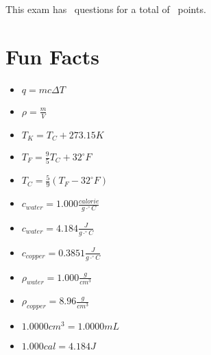 \documentclass[11pt,addpoints]{exam}   	%
\begin{document}
\begin{center}
This exam has \numquestions\ questions for a total of \numpoints\ points.
\end{center}

\pagebreak
\section*{Fun Facts}
\begin{itemize}
\item
$q = m c \Delta T$
\vspace{0.2in}

\item
$\rho = \frac{m}{V} $
\vspace{0.2in}

\item
$T_K = T_C + 273.15 K$
\vspace{0.2in}

\item
$T_F = \frac{9}{5}T_C + 32^{\circ}F$
\vspace{0.2in}

\item
$T_C = \frac{5}{9}(T_F - 32^{\circ}F)$
\vspace{0.2in}

\item
$c_{water} = 1.000 \frac{calorie}{g \cdot ^{\circ}C}$
\vspace{0.2in}

\item
$c_{water} = 4.184 \frac{J}{g \cdot ^{\circ}C}$
\vspace{0.2in}

\item
$c_{copper} = 0.3851 \frac{J}{g \cdot ^{\circ}C}$
\vspace{0.2in}

\item
$\rho_{water} = 1.000 \frac{g}{cm^3}$
\vspace{0.2in}

\item
$\rho_{copper} = 8.96 \frac{g}{cm^3}$
\vspace{0.2in}

\item
$ 1.0000 cm^3 = 1.0000 mL $
\vspace{0.2in}

\item
$ 1.000 cal = 4.184 J $
\end{itemize}
\vspace{0.2in}
\end{document}
